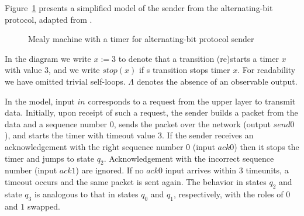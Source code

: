 Figure~\ref{fig:abp} presents a simplified model of the sender from 
the alternating-bit protocol, adapted from \cite[Figure 3.15]{KR13}.
\begin{figure}[h]
\centering
\vspace{-2 em}
\caption{Mealy machine with a timer for alternating-bit protocol sender}
\label{fig:abp}
\end{figure}
In the diagram we write $x :=3$ to denote that a transition (re)starts a timer $x$ with value $3$,
and we write $\mathit{stop}(x)$ if s transition stops timer $x$.
For readability we have omitted trivial self-loops.
\iflong
$\Lambda$ denotes the absence of an observable output. 

In the model, input $\mathit{in}$ corresponds to a request from the upper layer to transmit data.
Initially, upon receipt of such a request, the sender builds a packet from the data and a sequence number $0$,
sends the packet over the network (output $\mathit{send0}$), and starts the timer with timeout value $3$.
If the sender receives an acknowledgement with the right sequence number $0$ (input $\mathit{ack0}$) 
then it stops the timer and jumps to state $q_2$.
Acknowledgement with the incorrect sequence number (input $\mathit{ack1}$) are ignored.
If no $\mathit{ack0}$ input arrives within $3$ timeunits, a timeout occurs and the same packet is sent again.
The behavior in states $q_2$ and state $q_3$ is analogous to that in states $q_0$ and $q_1$, respectively,
with the roles of $0$ and $1$ swapped.
\fi

